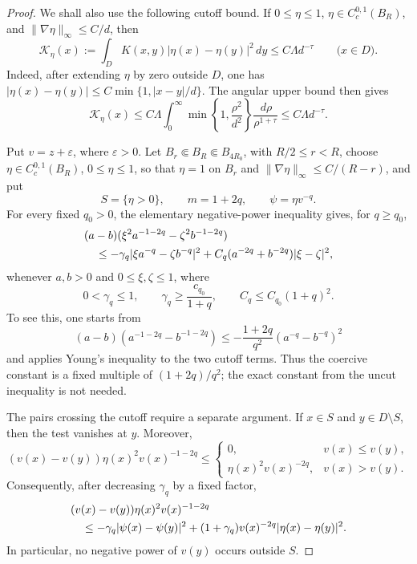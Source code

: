 \documentclass[11pt,reqno]{amsart}
\numberwithin{equation}{section}
\newcommand{\dd}{\,d}
\theoremstyle{remark}
\begin{document}
\begin{proof}
We shall also use the following cutoff bound.  If \(0\le\eta\le1\),
\(\eta\in C_c^{0,1}(B_R)\), and
\(\|\nabla\eta\|_\infty\le C/d\), then
\begin{equation}
 \mathcal K_\eta(x):=
 \int_DK(x,y)|\eta(x)-\eta(y)|^2\dd y
 \le C\Lambda d^{-\tau}
 \qquad \bigl(x\in D\bigr).
 \label{eq:kato-cutoff-kernel-bound}
\end{equation}
Indeed, after extending \(\eta\) by zero outside \(D\), one has
\(|\eta(x)-\eta(y)|\le C\min\{1,|x-y|/d\}\).  The angular upper bound
then gives
\[
 \mathcal K_\eta(x)
 \le C\Lambda\int_0^\infty
 \min\left\{1,\frac{\rho^2}{d^2}\right\}
 \frac{\dd\rho}{\rho^{1+\tau}}
 \le C\Lambda d^{-\tau}.
\]

Put \(v=z+\varepsilon\), where \(\varepsilon>0\).  Let
\(B_r\Subset B_R\Subset B_{4R_0}\), with \(R/2\le r<R\), choose
\(\eta\in C_c^{0,1}(B_R)\), \(0\le\eta\le1\), so that
\(\eta=1\) on \(B_r\) and
\(\|\nabla\eta\|_\infty\le C/(R-r)\), and put
\[
 S=\{\eta>0\},\qquad m=1+2q,\qquad \psi=\eta v^{-q}.
\]
For every fixed \(q_0>0\), the elementary negative-power inequality
gives, for \(q\ge q_0\),
\begin{align}
 &(a-b)(\xi^2a^{-1-2q}-\zeta^2b^{-1-2q})\notag\\
 &\quad\le-\gamma_q
 |\xi a^{-q}-\zeta b^{-q}|^2
 +C_q(a^{-2q}+b^{-2q})|\xi-\zeta|^2,
 \label{eq:kato-interior-negative-power-scalar}
\end{align}
whenever \(a,b>0\) and \(0\le\xi,\zeta\le1\), where
\begin{equation*}
 0<\gamma_q\le1,\qquad
 \gamma_q\ge\frac{c_{q_0}}{1+q},
 \qquad C_q\le C_{q_0}(1+q)^2.
\end{equation*}
To see this, one starts from
\[
 (a-b)(a^{-1-2q}-b^{-1-2q})
 \le-\frac{1+2q}{q^2}(a^{-q}-b^{-q})^2
\]
and applies Young's inequality to the two cutoff terms.  Thus the
coercive constant is a fixed multiple of
\((1+2q)/q^2\); the exact constant from the uncut inequality is not
needed.

The pairs crossing the cutoff require a separate argument.  If
\(x\in S\) and \(y\in D\setminus S\), then the test vanishes at \(y\).
Moreover,
\begin{equation*}
 (v(x)-v(y))\eta(x)^2v(x)^{-1-2q}
 \le
 \begin{cases}
  0, & v(x)\le v(y),\\
  \eta(x)^2v(x)^{-2q}, & v(x)>v(y).
 \end{cases}
\end{equation*}
Consequently, after decreasing \(\gamma_q\) by a fixed factor,
\begin{align}
 &(v(x)-v(y))\eta(x)^2v(x)^{-1-2q}\notag\\
 &\quad\le-\gamma_q|\psi(x)-\psi(y)|^2
 +(1+\gamma_q)v(x)^{-2q}
       |\eta(x)-\eta(y)|^2.
 \label{eq:kato-crossed-negative-power-scalar}
\end{align}
In particular, no negative power of \(v(y)\) occurs outside \(S\).


\end{proof}
\end{document}
